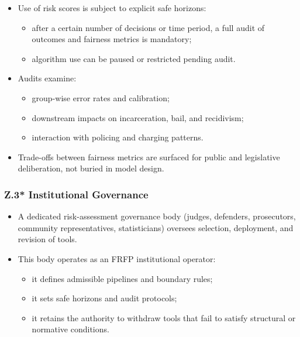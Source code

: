 \begin{itemize}
  \item Use of risk scores is subject to explicit safe horizons:
        \begin{itemize}
          \item after a certain number of decisions or time period, a full
                audit of outcomes and fairness metrics is mandatory;
          \item algorithm use can be paused or restricted pending audit.
        \end{itemize}
  \item Audits examine:
        \begin{itemize}
          \item group-wise error rates and calibration;
          \item downstream impacts on incarceration, bail, and recidivism;
          \item interaction with policing and charging patterns.
        \end{itemize}
  \item Trade-offs between fairness metrics are surfaced for public and
        legislative deliberation, not buried in model design.
\end{itemize}

\subsubsection*{Z.3* Institutional Governance}

\begin{itemize}
  \item A dedicated risk-assessment governance body (judges, defenders,
        prosecutors, community representatives, statisticians) oversees
        selection, deployment, and revision of tools.
  \item This body operates as an FRFP institutional operator:
        \begin{itemize}
          \item it defines admissible pipelines and boundary rules;
          \item it sets safe horizons and audit protocols;
          \item it retains the authority to withdraw tools that fail to satisfy
                structural or normative conditions.
        \end{itemize}
\end{itemize}

